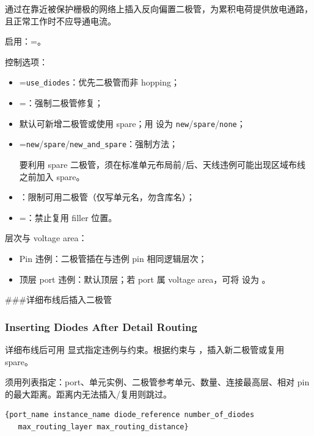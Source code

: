 通过在靠近被保护栅极的网络上插入反向偏置二极管，为累积电荷提供放电通路，且正常工作时不应导通电流。

启用：=。

控制选项：
\begin{itemize}
  \item {}=\texttt{use\_diodes}：优先二极管而非 hopping；
  \item {}=：强制二极管修复；
  \item 默认可新增二极管或使用 spare；用  设为 \texttt{new}/\texttt{spare}/\texttt{none}；
  \item {}=\texttt{new}/\texttt{spare}/\texttt{new\_and\_spare}：强制方法；
\begin{noteBox}
要利用 spare 二极管，须在标准单元布局前/后、天线违例可能出现区域布线之前加入 spare。
\end{noteBox}
  \item {}：限制可用二极管（仅写单元名，勿含库名）；
  \item {}=：禁止复用 filler 位置。
\end{itemize}

层次与 voltage area：
\begin{itemize}
  \item Pin 违例：二极管插在与违例 pin 相同逻辑层次；
  \item 顶层 port 违例：默认顶层；若 port 属 voltage area，可将  设为 。
\end{itemize}

###{详细布线后插入二极管}
\subsubsection*{Inserting Diodes After Detail Routing}

详细布线后可用  显式指定违例与约束。根据约束与 ，插入新二极管或复用 spare。

须用列表指定：port、单元实例、二极管参考单元、数量、连接最高层、相对 pin 的最大距离。距离内无法插入/复用则跳过。

\begin{lstlisting}
{port_name instance_name diode_reference number_of_diodes
   max_routing_layer max_routing_distance}
\end{lstlisting}


